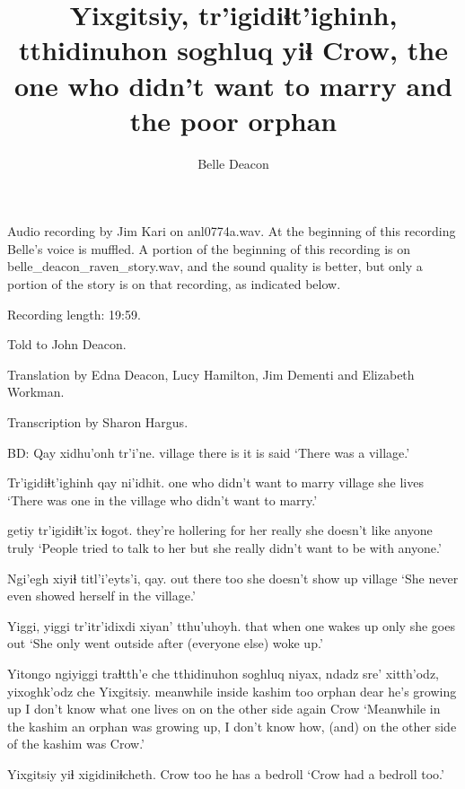 \documentclass[12pt]{article}
\begin{document}
\title{Yixgitsiy, tr'igidiɬt'ighinh, tthidinuhon
soghluq yiɬ \newline Crow, the one who didn't want to marry and the poor orphan}
\author{Belle Deacon}
\date{}
\maketitle

Audio recording by Jim Kari on anl0774a.wav.  At the beginning of this recording Belle's voice is muffled.
A portion of the beginning of this recording is on belle\_deacon\_raven\_story.wav, and the sound quality is better, 
but only a portion of the story is on that recording, as indicated below.

Recording length:  19:59.

Told to John Deacon.

Translation by Edna Deacon, Lucy Hamilton, Jim Dementi and Elizabeth
Workman.

Transcription by Sharon Hargus.

BD:  
\gll Qay xidhu'onh tr'i'ne.
village {there is} {it is said}
\glt `There was a village.'
\glend

\gll Tr'igidiɬt'ighinh qay     {ni'idhit.}
{one who didn't want to marry}       village {she lives}
\glt `There was one in the village who didn't want to marry.'
\glend

         getiy  tr'igidiɬt'ix           ɬogot.
{they're hollering for her} really {she doesn't like anyone} truly
\glt `People tried to talk to her but she really didn't want to be with anyone.'
\glend

\gll Ngi'egh   xiyiɬ {titl'i'eyts'i}, qay.
{out there} too   {she doesn't show up} village
\glt `She never even showed herself in the village.'
\glend

\gll  Yiggi, yiggi tr'itr'idixdi xiyan' tthu'uhoyh.
that  {} {when one wakes up} only   {she goes out}
\glt `She only went outside after (everyone else) woke up.'
\glend

\gll Yitongo   ngiyiggi  traɬtth'e che tthidinuhon soghluq niyax, {ndadz sre'}   xitth'odz,   yixoghk'odz       che   Yixgitsiy.
meanwhile inside    kashim    too orphan      dear    {he's growing up} {I don't know} {what one lives on} {on the other side} again Crow
\glt `Meanwhile in the kashim an orphan was growing up, I don't know how, (and) on the other side of the kashim was Crow.'
\glend

\gll Yixgitsiy yiɬ xigidiniɬcheth.
Crow      too {he has a bedroll}
\glt `Crow had a bedroll too.'
\glend
\end{document}
